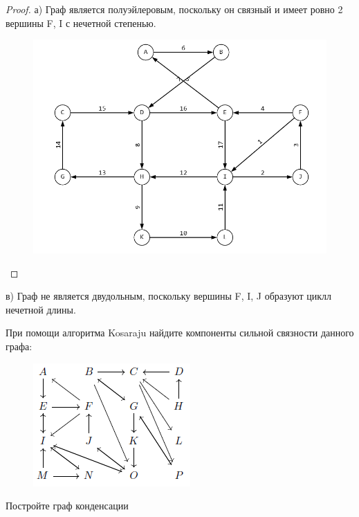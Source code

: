 \begin{proof}
	а) Граф является полуэйлеровым, поскольку он связный и имеет ровно 2 вершины F, I с нечетной степенью.

    \begin{figure}[h]
    \centering
     \includegraphics[width=0.45\linewidth]{pics/5th_a_solution.png}
     \label{fig:dm}
    \end{figure} 
\end{proof}
    в) Граф не является двудольным, поскольку вершины F, I, J образуют циклл нечетной длины.
    
\begin{problem}[8]
	При помощи алгоритма Kosaraju найдите компоненты сильной связности данного графа:
 
    \begin{figure}[h]
    \centering
     \includegraphics[width=0.3\linewidth]{pics/Graph8th.png}
     \label{fig:dm}
    \end{figure}

    Постройте граф конденсации
\end{problem}

